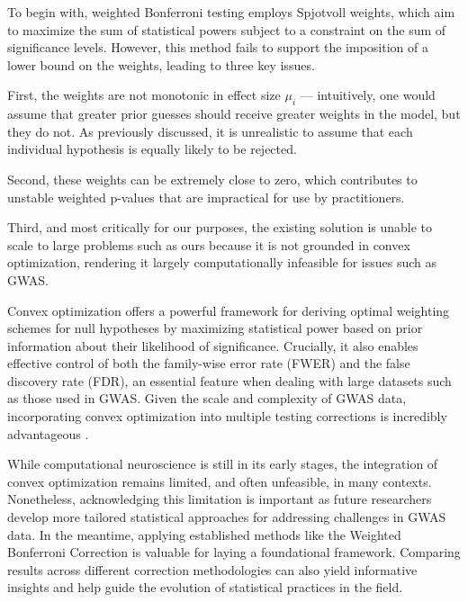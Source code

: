 \documentclass[12pt]{article}
\begin{document}
To begin with, weighted Bonferroni testing employs Spjotvoll weights, which aim to maximize the sum of statistical powers subject to a constraint on the sum of significance levels. However, this method fails to support the imposition of a lower bound on the weights, leading to three key issues. \par

First, the weights are not monotonic in effect size \(\mu_i\) — intuitively, one would assume that greater prior guesses should receive greater weights in the model, but they do not. As previously discussed, it is unrealistic to assume that each individual hypothesis is equally likely to be rejected. \par

Second, these weights can be extremely close to zero, which contributes to unstable weighted p-values that are impractical for use by practitioners. \par

Third, and most critically for our purposes, the existing solution is unable to scale to large problems such as ours because it is not grounded in convex optimization, rendering it largely computationally infeasible for issues such as GWAS. \par

Convex optimization offers a powerful framework for deriving optimal weighting schemes for null hypotheses by maximizing statistical power based on prior information about their likelihood of significance. Crucially, it also enables effective control of both the family-wise error rate (FWER) and the false discovery rate (FDR), an essential feature when dealing with large datasets such as those used in GWAS. Given the scale and complexity of GWAS data, incorporating convex optimization into multiple testing corrections is incredibly advantageous \cite{Wang2023}. \par

While computational neuroscience is still in its early stages, the integration of convex optimization remains limited, and often unfeasible, in many contexts. Nonetheless, acknowledging this limitation is important as future researchers develop more tailored statistical approaches for addressing challenges in GWAS data. In the meantime, applying established methods like the Weighted Bonferroni Correction is valuable for laying a foundational framework. Comparing results across different correction methodologies can also yield informative insights and help guide the evolution of statistical practices in the field.
\end{document}
